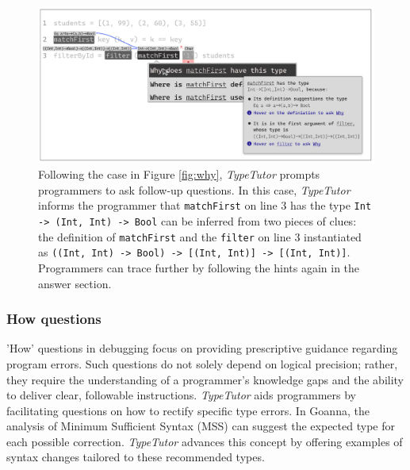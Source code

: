 \begin{figure}[hbt]
  \includegraphics[width=\linewidth]{FollowUp}
  \caption{
     Following the case in Figure \ref{fig:why}, \textit{TypeTutor} prompts programmers to ask follow-up questions. In this case, \textit{TypeTutor} informs the programmer that \texttt{matchFirst} on line 3 has the type \texttt{Int -> (Int, Int) -> Bool} can be inferred from two pieces of clues:  the definition of \texttt{matchFirst} and the \texttt{filter} on line 3 instantiated as \texttt{((Int, Int) -> Bool) -> [(Int, Int)] -> [(Int, Int)]}. Programmers can trace further by following the hints again in the answer section.
    }
\end{figure}

\subsubsection{How questions}

'How' questions in debugging focus on providing prescriptive guidance regarding program errors. Such questions do not solely depend on logical precision; rather, they require the understanding of a programmer's knowledge gaps and the ability to deliver clear, followable instructions. \textit{TypeTutor} aids programmers by facilitating questions on how to rectify specific type errors. In Goanna, the analysis of Minimum Sufficient Syntax (MSS) can suggest the expected type for each possible correction. \textit{TypeTutor} advances this concept by offering examples of syntax changes tailored to these recommended types. 



